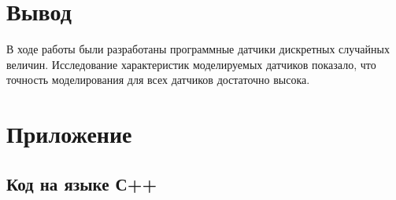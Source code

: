 \documentclass{article}
\begin{document}
   	\section{Вывод}
		В ходе работы были разработаны программные датчики  дискретных случайных величин. Исследование характеристик моделируемых датчиков показало, что точность моделирования для всех датчиков достаточно высока.
	\newpage
	
   	\section{Приложение}
   		\subsection{Код на языке С++}
   			
			
			
	
	
\end{document}
